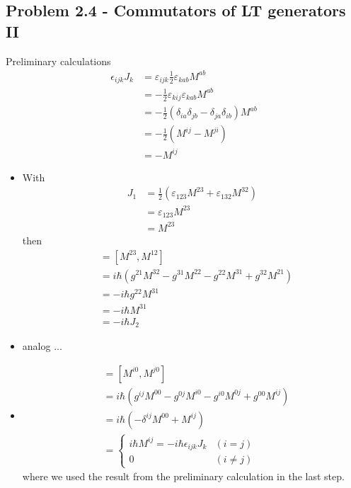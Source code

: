 \documentclass[../main.tex]{subfiles}
\begin{document}
\subsection{Problem 2.4 - Commutators of LT generators II}
Preliminary calculations
\begin{align}
\epsilon_{ijk}J_k
&=\varepsilon_{ijk}\frac{1}{2}\varepsilon_{kab}M^{ab}\\
&=-\frac{1}{2}\varepsilon_{kij}\varepsilon_{kab}M^{ab}\\
&=-\frac{1}{2}\left(\delta_{ia}\delta_{jb}-\delta_{ja}\delta_{ib}\right)M^{ab}\\
&=-\frac{1}{2}\left(M^{ij}-M^{ji}\right)\\
&=-M^{ij}
\end{align}
\begin{itemize}
\item  With
\begin{align}
J_1
&=\frac{1}{2}(\varepsilon_{123}M^{23}+\varepsilon_{132}M^{32})\\
&=\varepsilon_{123}M^{23}\\
&=M^{23}
\end{align}
then
\begin{align}
[J_1,J_3]
&=[M^{23},M^{12}]\\
&=i\hbar\left(g^{21}M^{32}-g^{31}M^{22}-g^{22}M^{31}+g^{32}M^{21}\right)\\
&=-i\hbar g^{22}M^{31}\\
&=-i\hbar M^{31}\\
&=-i\hbar J_2
\end{align}
\item analog ...
\item
\begin{align}
[K^i,K^j]
&=[M^{i0},M^{j0}]\\
&=i\hbar\left(g^{ij}M^{00}-g^{0j}M^{i0}-g^{i0}M^{0j}+g^{00}M^{ij}\right)\\
&=i\hbar\left(-\delta^{ij}M^{00}+M^{ij}\right) \\
&=\left\{
\begin{array}{ll} 
i\hbar M^{ij}=-i\hbar\epsilon_{ijk}J_k 	& (i=j)\\
 0 										& (i\neq j)
\end{array}\right.
\end{align}
where we used the result from the preliminary calculation in the last step.
\end{itemize}
\end{document}
